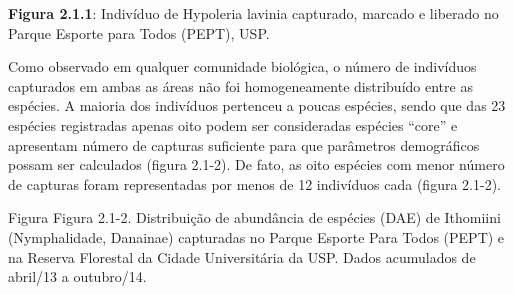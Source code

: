 \textbf{Figura 2.1.1}: Indivíduo de Hypoleria lavinia capturado, marcado e liberado no Parque Esporte para Todos (PEPT), USP.

Como observado em qualquer comunidade biológica, o número de indivíduos capturados em ambas as áreas não foi homogeneamente distribuído entre as espécies. A maioria dos indivíduos pertenceu a poucas espécies, sendo que das 23 espécies registradas apenas oito podem ser consideradas espécies “core” e apresentam número de capturas suficiente para que parâmetros demográficos possam ser calculados (figura 2.1-2). De fato, as oito espécies com menor número de capturas foram representadas por menos de 12 indivíduos cada (figura 2.1-2).

Figura
Figura 2.1-2. Distribuição de abundância de espécies (DAE) de Ithomiini (Nymphalidade, Danainae) capturadas no Parque Esporte Para Todos (PEPT) e na Reserva Florestal da Cidade Universitária da USP. Dados acumulados de abril/13 a outubro/14.





